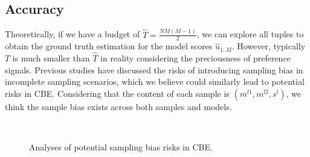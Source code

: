 \subsection{Accuracy}
\label{sec:3.2}
Theoretically, if we have a budget of $\hat{T}=\frac{NM(M-1)}{2}$, we can explore all tuples to obtain the ground truth estimation for the model scores $\hat{u}_{1:M}$. 
However, typically $T$ is much smaller than $\hat{T}$ in reality considering the preciousness of preference signals. 
Previous studies \citep{samplebias1,samplebias2} have discussed the risks of introducing sampling bias in incomplete sampling scenarios, which we believe could similarly lead to potential risks in CBE. %
Considering that the content of each sample is $(m^{l1},m^{l2},s^l)$, we think the sample bias exists across both samples and models. 

\begin{figure}[ht]
    \centering
    \hfill
     \\
    \vspace{-0.2cm}
    \vspace{-0.2cm}
    \caption{Analyses of potential sampling bias risks in CBE.}
    \vspace{-0.4cm}
    \label{fig:samplebias}
\end{figure}


